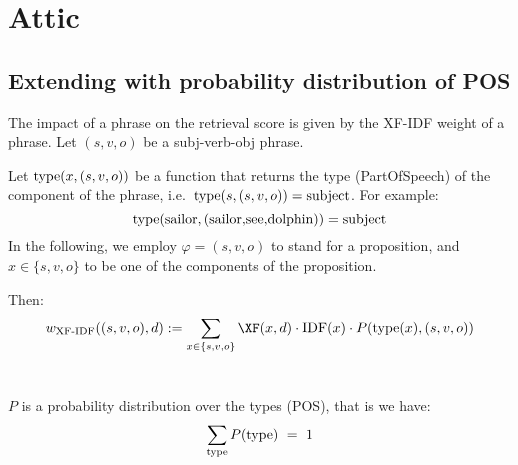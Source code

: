 \section{Attic}
\subsection{Extending with probability distribution of POS}
The impact of a phrase on the retrieval score is given by the XF-IDF
weight of a phrase.
%
Let $(s,v,o)$ be a subj-verb-obj phrase.

Let $\textmd{type}(x,(s,v,o))$ be a function that returns the type (PartOfSpeech) of the component
of the phrase, i.e.~$\textmd{type}(s,(s,v,o))=\textmd{subject}$.
For example:
\[
\textmd{type}(\textmd{sailor},\textmd{(sailor,see,dolphin)})=\textmd{subject}
\]
In the following, we employ $\varphi=(s,v,o)$ to stand for a proposition, and $x\in\{s,v,o\}$ to be one of the components of the proposition.

Then:
\begin{equation}
\label{eq:xf-idf}
w_\textmd{XF-IDF}((s,v,o),d) :=
\sum_{x \in \{s,v,o\}} \XF(x,d) \cdot 
\IDF(x) \cdot P(\textmd{type}(x),(s,v,o))
\end{equation}
\


$P$ is a probability distribution over the types (POS), that is we have:
\[
\sum_{\textmd{type}} P(\textmd{type})  \ = \ 1
\]

